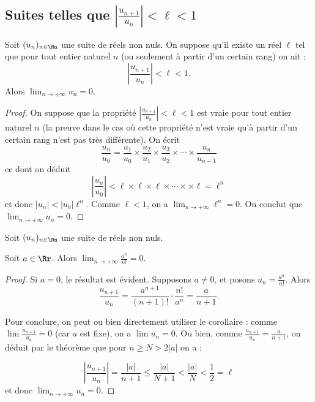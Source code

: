 \documentclass[class=report,crop=false]{standalone}
\begin{document}
\subsection{Suites telles que $\left|\frac{u_{n+1}}{u_n}\right|<\ell<1$ }

\begin{theoreme}
Soit  $(u_n)_{n\in \Nn}$ une suite de réels non nuls. On suppose qu'il existe un réel $\ell$
tel que pour tout entier naturel $n$ (ou seulement à partir d'un certain rang) on ait :
\[ \left | \frac{u_{n+1}}{u_n}\right |  <\ell<1.\]
Alors $\lim_{n\to +\infty} u_n= 0$.

\end{theoreme}

\begin{proof}
  On suppose que la propriété $\left|\frac{u_{n+1}}{u_n}\right|<\ell<1$ est vraie
pour tout entier naturel $n$ (la preuve dans le cas où cette propriété n'est vraie
qu'à partir d'un certain rang n'est pas très différente).
  On écrit
  \[ \frac{u_n}{u_0}=\frac{u_1}{u_0} \times\frac{u_2}{u_1} \times\frac{u_3}{u_2} \times\cdots\times \frac{u_n}{u_{n-1}}\]
ce dont on déduit
  \[ \left\lvert\frac{u_n}{u_0}  \right\rvert <\ell\times \ell\times \ell \times \cdots \times \times \ell=\ell^n\]
et donc $\lvert u_n \rvert <\lvert u_0 \rvert \ell^n$. Comme $\ell<1$, on a $\lim_{n\to +\infty} \ell^n= 0$.
On conclut que $\lim_{n\to +\infty} u_n= 0$.
\end{proof}

\begin{corollaire}
Soit  $(u_n)_{n\in \Nn}$ une suite de réels non nuls.
\end{corollaire}

\begin{exemple}
Soit $a\in \Rr$. Alors $\lim_{n\to +\infty} \frac{a^n}{n!} =0$.
\end{exemple}

\begin{proof}
  Si $a=0$, le résultat est évident. Supposons $a\neq 0$, et posons $u_n= \frac{a^n}{n!}$. Alors
  \[\frac{u_{n+1}}{u_n}= \frac{a^{n+1}}{(n+1)!}\cdot \frac{n!}{a^n}=\frac{a}{n+1} .\]

  Pour conclure, on peut ou bien directement utiliser le corollaire : comme $\lim \frac{u_{n+1}}{u_n} = 0$
  (car $a$ est fixe), on a $\lim u_n = 0$. Ou bien, comme $\frac{u_{n+1}}{u_n} = \frac{a}{n+1}$, on
  déduit par le théorème que pour $n\geq N>2 \lvert a \rvert $ on a :

  \[\left | \frac{u_{n+1}}{u_n}\right | =\frac{\lvert a \rvert }{n+1}\leq
  \frac{\lvert a \rvert }{N+1}<\frac{\lvert a \rvert  }{N}< \frac{1}{2} =\ell\]
et donc $\lim_{n\to +\infty} u_n =0$.
\end{proof}
\end{document}
